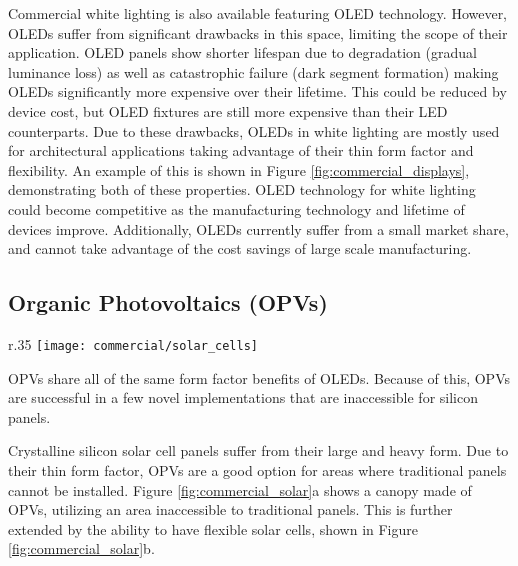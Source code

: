 \documentclass[../thesis.tex]{subfiles}
\begin{document}
Commercial white lighting is also available featuring OLED technology.
However, OLEDs suffer from significant drawbacks in this space, limiting the scope of their application.\supercite{Statt2016}
OLED panels show shorter lifespan due to degradation (gradual luminance loss) as well as catastrophic failure (dark segment formation) making OLEDs significantly more expensive over their lifetime.
This could be reduced by device cost, but OLED fixtures are still more expensive than their LED counterparts.
Due to these drawbacks, OLEDs in white lighting are mostly used for architectural applications taking advantage of their thin form factor and flexibility.\supercite{OLEDWorks,Evangeline2018}
An example of this is shown in Figure \ref{fig:commercial_displays}, demonstrating both of these properties.\supercite{Statt2016}
OLED technology for white lighting could become competitive as the manufacturing technology and lifetime of devices improve.
Additionally, OLEDs currently suffer from a small market share, and cannot take advantage of the cost savings of large scale manufacturing.



\subsection{Organic Photovoltaics (OPVs)}

\begin{wrapfigure}{r}{.35\textwidth}
\centering
\texttt{[image: commercial/solar\_cells]}
\caption{(a) Belectric solar cells. (b) Transparent solar cell from Michigan State University.  (c) Flexible solar cell from InfinityPV.}
\label{fig:commercial_solar}
\end{wrapfigure}

OPVs share all of the same form factor benefits of OLEDs.  
Because of this, OPVs are successful in a few novel implementations that are inaccessible for silicon panels.\supercite{Schlenker2011,Sapkota2014,Kenning2017,Gregg2003,Peumans2003}

Crystalline silicon solar cell panels suffer from their large and heavy form.
Due to their thin form factor, OPVs are a good option for areas where traditional panels cannot be installed.\supercite{FitzgeraldWeaver2017,Wesoff2014}
Figure \ref{fig:commercial_solar}a shows a canopy made of OPVs, utilizing an area inaccessible to traditional panels.
This is further extended by the ability to have flexible solar cells, shown in Figure \ref{fig:commercial_solar}b.\supercite{InfinityPV2018}
\end{document}
